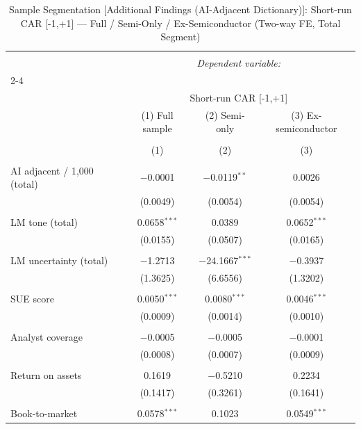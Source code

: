 
\begin{table}[!htbp] \centering 
  \caption{Sample Segmentation [Additional Findings (AI-Adjacent Dictionary)]: Short-run CAR [-1,+1] — Full / Semi-Only / Ex-Semiconductor (Two-way FE, Total Segment)} 
  \label{} 
\begin{tabular}{@{\extracolsep{5pt}}lccc} 
\\[-1.8ex]\hline 
\hline \\[-1.8ex] 
 & \multicolumn{3}{c}{\textit{Dependent variable:}} \\ 
\cline{2-4} 
\\[-1.8ex] & \multicolumn{3}{c}{Short-run CAR [-1,+1]} \\ 
 & (1) Full sample & (2) Semi-only & (3) Ex-semiconductor \\ 
\\[-1.8ex] & (1) & (2) & (3)\\ 
\hline \\[-1.8ex] 
 AI adjacent / 1,000 (total) & $-$0.0001 & $-$0.0119$^{**}$ & 0.0026 \\ 
  & (0.0049) & (0.0054) & (0.0054) \\ 
  & & & \\ 
 LM tone (total) & 0.0658$^{***}$ & 0.0389 & 0.0652$^{***}$ \\ 
  & (0.0155) & (0.0507) & (0.0165) \\ 
  & & & \\ 
 LM uncertainty (total) & $-$1.2713 & $-$24.1667$^{***}$ & $-$0.3937 \\ 
  & (1.3625) & (6.6556) & (1.3202) \\ 
  & & & \\ 
 SUE score & 0.0050$^{***}$ & 0.0080$^{***}$ & 0.0046$^{***}$ \\ 
  & (0.0009) & (0.0014) & (0.0010) \\ 
  & & & \\ 
 Analyst coverage & $-$0.0005 & $-$0.0005 & $-$0.0001 \\ 
  & (0.0008) & (0.0007) & (0.0009) \\ 
  & & & \\ 
 Return on assets & 0.1619 & $-$0.5210 & 0.2234 \\ 
  & (0.1417) & (0.3261) & (0.1641) \\ 
  & & & \\ 
 Book-to-market & 0.0578$^{***}$ & 0.1023 & 0.0549$^{***}$ \\ 

\end{tabular}
\end{table}
